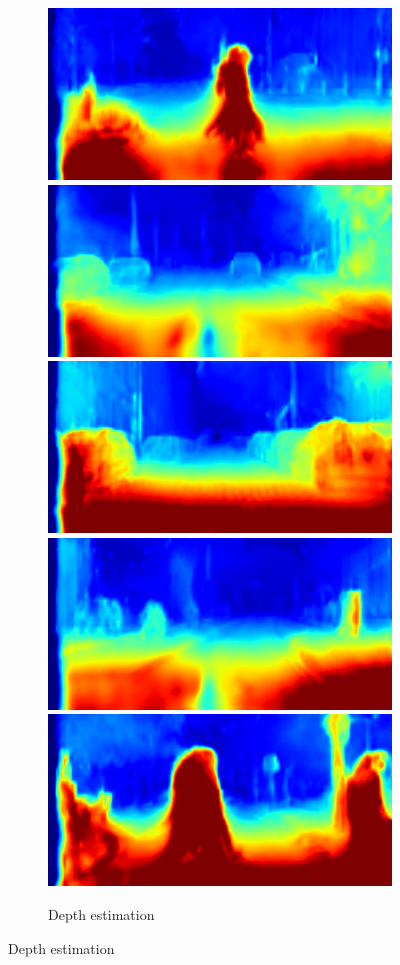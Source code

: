 \begin{figure}[t]
\begin{subfigure}[t]{\linewidth}
\begin{center}
\includegraphics[width=0.19\linewidth]{image_000050_000019_depth.png}
\includegraphics[width=0.19\linewidth]{image_000045_000019_depth.png}
\includegraphics[width=0.19\linewidth]{image_000046_000019_depth.png}
\includegraphics[width=0.19\linewidth]{image_000038_000019_depth.png}
\includegraphics[width=0.19\linewidth]{image_000071_000019_depth.png}
\vspace{-2mm}
  \caption{Depth estimation}
\end{center}
\end{subfigure}


\end{figure}
